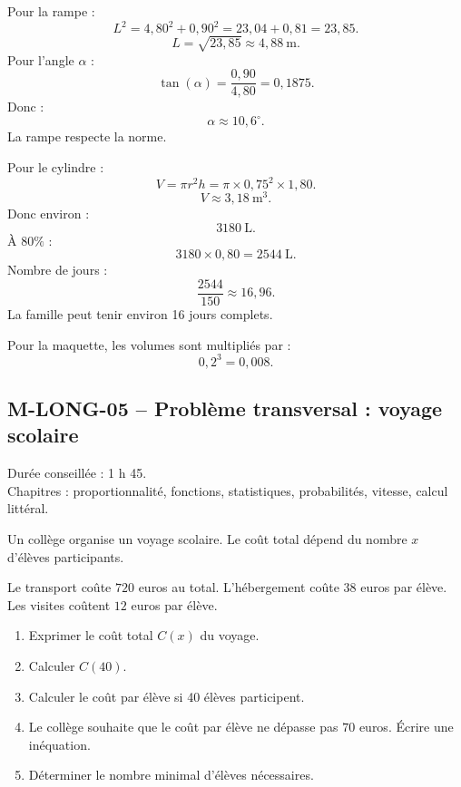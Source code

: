 \begin{correction}
Pour la rampe :
\[
L^2=4{,}80^2+0{,}90^2=23{,}04+0{,}81=23{,}85.
\]
\[
L=\sqrt{23{,}85}\approx4{,}88\ \mathrm{m}.
\]
Pour l'angle $\alpha$ :
\[
\tan(\alpha)=\frac{0{,}90}{4{,}80}=0{,}1875.
\]
Donc :
\[
\alpha\approx10{,}6^\circ.
\]
La rampe respecte la norme.

Pour le cylindre :
\[
V=\pi r^2h=\pi\times0{,}75^2\times1{,}80.
\]
\[
V\approx3{,}18\ \mathrm{m^3}.
\]
Donc environ :
\[
3180\ \mathrm{L}.
\]
À $80\%$ :
\[
3180\times0{,}80=2544\ \mathrm{L}.
\]
Nombre de jours :
\[
\frac{2544}{150}\approx16{,}96.
\]
La famille peut tenir environ 16 jours complets.

Pour la maquette, les volumes sont multipliés par :
\[
0{,}2^3=0{,}008.
\]
\end{correction}

\newpage

\subsection{M-LONG-05 -- Problème transversal : voyage scolaire}

\begin{objectif}
Durée conseillée : 1 h 45.\\
Chapitres : proportionnalité, fonctions, statistiques, probabilités, vitesse, calcul littéral.
\end{objectif}

\begin{exercice}
Un collège organise un voyage scolaire. Le coût total dépend du nombre $x$ d'élèves participants.

Le transport coûte $720$ euros au total. L'hébergement coûte $38$ euros par élève. Les visites coûtent $12$ euros par élève.

\begin{enumerate}
  \item Exprimer le coût total $C(x)$ du voyage.
  \item Calculer $C(40)$.
  \item Calculer le coût par élève si 40 élèves participent.
  \item Le collège souhaite que le coût par élève ne dépasse pas $70$ euros. Écrire une inéquation.
  \item Déterminer le nombre minimal d'élèves nécessaires.
\end{enumerate}
\end{exercice}

